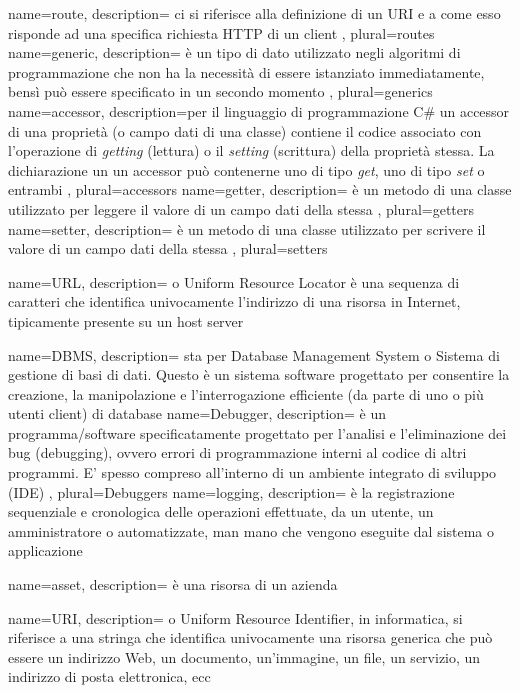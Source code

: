  {
	name=route,
	description={ ci si riferisce alla definizione di un URI e a come esso risponde ad una specifica richiesta HTTP di un client
	},
	plural=routes
}
 {
	name=generic,
	description={ è un tipo di dato utilizzato negli algoritmi di programmazione che non ha la necessità di essere istanziato immediatamente, bensì può essere specificato in un secondo momento
	},
	plural=generics
}
 {
	name=accessor,
	description={per il linguaggio di programmazione C\# un accessor di una proprietà (o campo dati di una classe) contiene il codice associato con l'operazione di \textit{getting} (lettura) o il \textit{setting} (scrittura) della proprietà stessa. La dichiarazione un un accessor può contenerne uno di tipo \textit{get}, uno di tipo \textit{set} o entrambi
	},
	plural=accessors
}
 {
	name=getter,
	description={ è un metodo di una classe utilizzato per leggere il valore di un campo dati della stessa
	},
	plural=getters
}
 {
	name=setter,
	description={ è un metodo di una classe utilizzato per scrivere il valore di un campo dati della stessa
	},
	plural=setters
}

 {
	name={URL},
	description={ o Uniform Resource Locator è una sequenza di caratteri che identifica univocamente l'indirizzo di una risorsa in Internet, tipicamente presente su un host server
	}
}

 {
	name={DBMS},
	description={ sta per Database Management System o Sistema di gestione di basi di dati. Questo è un sistema software progettato per consentire la creazione, la manipolazione e l'interrogazione efficiente (da parte di uno o più utenti client) di database
	}
}
 {
	name=Debugger,
	description={ è un programma/software specificatamente progettato per l'analisi e l'eliminazione dei bug (debugging), ovvero errori di programmazione interni al codice di altri programmi. E' spesso compreso all'interno di un ambiente integrato di sviluppo (IDE)
	},
	plural=Debuggers
}
 {
	name=logging,
	description={ è la registrazione sequenziale e cronologica delle operazioni effettuate, da un utente, un amministratore o automatizzate, man mano che vengono eseguite dal sistema o applicazione
	}
}

 {
	name=asset,
	description={ è una risorsa di un azienda
	}
}


 {
	name={URI},
	description={ o Uniform Resource Identifier, in informatica, si riferisce a una stringa che identifica univocamente una risorsa generica che può essere un indirizzo Web, un documento, un'immagine, un file, un servizio, un indirizzo di posta elettronica, ecc
	}
}


